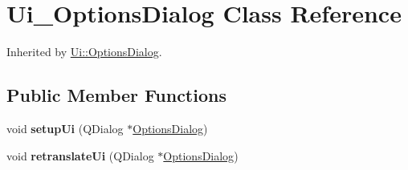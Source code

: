 \hypertarget{class_ui___options_dialog}{}\section{Ui\+\_\+\+Options\+Dialog Class Reference}
\label{class_ui___options_dialog}


Inherited by \mbox{\hyperlink{class_ui_1_1_options_dialog}{Ui\+::\+Options\+Dialog}}.

\subsection*{Public Member Functions}
\begin{DoxyCompactItemize}
\item 
\mbox{\label{class_ui___options_dialog_a47bf14cad55739827a2a327a28113e39}} 
void {\bfseries setup\+Ui} (Q\+Dialog $\ast$\mbox{\hyperlink{class_options_dialog}{Options\+Dialog}})
\item 
\mbox{\label{class_ui___options_dialog_a94a42dd5b39a8472c62c8bec283f11ea}} 
void {\bfseries retranslate\+Ui} (Q\+Dialog $\ast$\mbox{\hyperlink{class_options_dialog}{Options\+Dialog}})
\end{DoxyCompactItemize}

